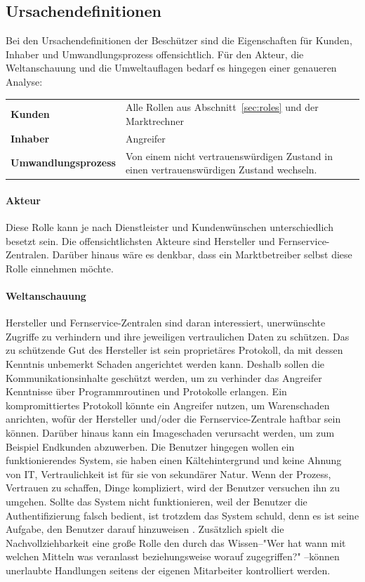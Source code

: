 \documentclass[11pt,a4paper]{report}
\begin{document}
\subsection{Ursachendefinitionen}

Bei den Ursachendefinitionen der Beschützer sind die Eigenschaften für Kunden, Inhaber und Umwandlungsprozess offensichtlich. Für den Akteur, die Weltanschauung und die Umweltauflagen bedarf es hingegen einer genaueren Analyse:

\setlength{\tabcolsep}{12pt}
\renewcommand{\arraystretch}{1.5}
\begin{table}[h] %
\begin{tabularx}{\linewidth}{@{}lX@{}}
\textbf{Kunden} & Alle Rollen aus Abschnitt~\ref{sec:roles} und der Marktrechner\\
\textbf{Inhaber} & Angreifer\\
\textbf{Umwandlungsprozess} & 
Von einem nicht vertrauenswürdigen Zustand in einen vertrauenswürdigen Zustand wechseln.\\
\end{tabularx}
\end{table}

\paragraph{Akteur} Diese Rolle kann je nach Dienstleister und Kundenwünschen unterschiedlich besetzt sein. Die offensichtlichsten Akteure sind Hersteller und Fernservice-Zentralen. Darüber hinaus wäre es denkbar, dass ein Marktbetreiber selbst diese Rolle einnehmen möchte.

\paragraph{Weltanschauung} Hersteller und Fernservice-Zentralen sind daran interessiert, unerwünschte Zugriffe zu verhindern und ihre jeweiligen vertraulichen Daten zu schützen. Das zu schützende Gut des Hersteller ist sein proprietäres Protokoll, da mit dessen Kenntnis unbemerkt Schaden angerichtet werden kann. Deshalb sollen die Kommunikationsinhalte geschützt werden, um zu verhinder das Angreifer Kenntnisse über Programmroutinen und Protokolle erlangen. Ein kompromittiertes Protokoll könnte ein Angreifer nutzen, um Warenschaden anrichten, wofür der Hersteller und/oder die Fernservice-Zentrale haftbar sein können. Darüber hinaus kann ein Imageschaden verursacht werden, um zum Beispiel Endkunden abzuwerben. Die Benutzer hingegen wollen ein funktionierendes System, sie haben einen Kältehintergrund und keine Ahnung von IT, Vertraulichkeit ist für sie von sekundärer Natur. Wenn der Prozess, Vertrauen zu schaffen, Dinge kompliziert, wird der Benutzer versuchen ihn zu umgehen. Sollte das System nicht funktionieren, weil der Benutzer die Authentifizierung falsch bedient, ist trotzdem das System schuld, denn es ist seine Aufgabe, den Benutzer darauf hinzuweisen \cite[s.~5]{gutmann}. Zusätzlich spielt die Nachvollziehbarkeit eine große Rolle den durch das Wissen--"Wer hat wann mit welchen Mitteln was veranlasst beziehungsweise worauf zugegriffen?" \cite{bsi_m2110}--können unerlaubte Handlungen seitens der eigenen Mitarbeiter kontrolliert werden.
\end{document}
